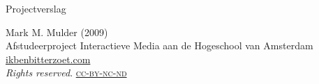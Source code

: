\thispagestyle{empty}

\begin{flushleft}

  \Huge
  Projectverslag\\

  \vfill{}

  \small
  Mark M. Mulder (2009)\\
  Afstudeerproject Interactieve Media aan de Hogeschool van Amsterdam\\
  \href{http://www.ikbenbitterzoet.com/}{ikbenbitterzoet.com}
  \\\emph{Rights reserved}.  \href{http://creativecommons.org/licenses/by-nc-nd/3.0/nl/}{\textsc{cc-by-nc-nd}}

\end{flushleft}
\pagebreak
\normalsize